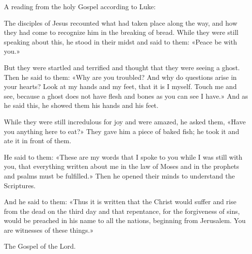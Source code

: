 \indent{} A reading from the holy Gospel according to Luke:

The disciples of Jesus recounted what had taken place along the way, and how they had come to recognize him in the breaking of bread. While they were still speaking about this, he stood in their midst and said to them: «Peace be with you.»

But they were startled and terrified and thought that they were seeing a ghost. Then he said to them: «Why are you troubled? And why do questions arise in your hearts? Look at my hands and my feet, that it is I myself. Touch me and see, because a ghost does not have flesh and bones as you can see I have.» And as he said this, he showed them his hands and his feet.

While they were still incredulous for joy and were amazed, he asked them, «Have you anything here to eat?» They gave him a piece of baked fish; he took it and ate it in front of them.

He said to them: «These are my words that I spoke to you while I was still with you, that everything written about me in the law of Moses and in the prophets and psalms must be fulfilled.» Then he opened their minds to understand the Scriptures.

And he said to them: «Thus it is written that the Christ would suffer and rise from the dead on the third day and that repentance, for the forgiveness of sins, would be preached in his name to all the nations, beginning from Jerusalem. You are witnesses of these things.»

The Gospel of the Lord.